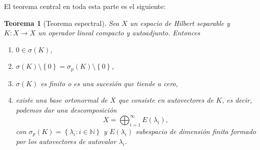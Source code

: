 \documentclass[12pt,a4paper]{article}
\newtheorem{thm}{Teorema}[section]
\theoremstyle{definition} \newtheorem{defn}[thm]{Definición}
\theoremstyle{definition} \newtheorem{ejemplo}[thm]{Ejemplo}
\theoremstyle{definition} \newtheorem{ejercicio}[thm]{Ejercicio}
\theoremstyle{remark} \newtheorem*{obs}{Observación}
\begin{document}
 El teorema central en toda esta parte es el siguiente:
 \begin{thm}[Teorema espectral]
   Sea $X$ un espacio de Hilbert separable y $K:X\rightarrow X$ un operador lineal compacto y autoadjunto. Entonces 
   \begin{enumerate}
     \item $0 \in \sigma(K)$,
     \item $\sigma(K) \setminus \left\{ 0 \right\} = \sigma_p(K) \setminus \left\{ 0 \right\}$,
     \item $\sigma(K)$ es finito o es una sucesión que tiende a cero,
     \item existe una base ortonormal de $X$ que consiste en autovectores de $K$, es decir, podemos dar una descomposición
       \begin{equation*}
	 X=\bigoplus_{i=1}^\infty E(\lambda_i),
       \end{equation*}
       con $\sigma_p(K)=\left\{ \lambda_i: i\in \mathbb{N} \right\}$ y $E(\lambda_i)$ subespacio de dimensión finita formado por los autovectores de autovalor $\lambda_i$.
   \end{enumerate}
 \end{thm}
\end{document}
